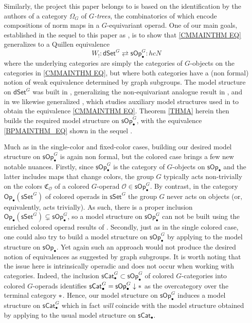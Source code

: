 \documentclass[a4paper,10pt
,draft
]{article}%
\numberwithin{equation}{section}
\numberwithin{figure}{section}
\theoremstyle{definition} %
\renewcommand{\O}{\ensuremath{\mathcal O}}
\newcommand{\1}{\ensuremath{\mathbbm 1}}%
\begin{document}
Similarly, the project this paper belongs to is based on the identification by the authors of a category
$\Omega_G$ of \emph{$G$-trees},
the combinatorics of which encode compositions of norm maps in a $G$-equivariant operad.
%
One of our main goals, established
in the sequel to this paper as \cite[Thm. I]{BP_TAS},
is to show that 
\eqref{CMMAINTHM EQ}
generalizes to a Quillen equivalence 
\begin{equation}\label{BPMAINTHM_EQ}
W_!\colon 
\mathsf{dSet}^G \rightleftarrows \mathsf{sOp}_{\bullet}^G
\colon hcN
\end{equation}
where the underlying categories are simply the categories 
of $G$-objects on the categories in 
\eqref{CMMAINTHM EQ},
but where both categories have a (non formal) notion of weak equivalence determined by graph subgroups.
The model structure on $\mathsf{dSet}^G$
was built in \cite{Per18},
generalizing the non-equivariant analogue result in \cite{BM11},
and in \cite{BP_edss} we likewise generalized \cite{CM13a},
which studies auxiliary model structures 
used in \cite{CM13b} to obtain the equivalence 
\eqref{CMMAINTHM EQ}.
Theorem \ref{THMA} herein then builds 
the required model structure on 
$\mathsf{sOp}_{\bullet}^G$,
with the equivalence \eqref{BPMAINTHM_EQ}
shown in the sequel \cite{BP_TAS}.


Much as in the single-color and fixed-color cases,
building our desired model structure
on $\mathsf{sOp}^G_{\bullet}$
is again non formal,
but the colored case brings a few new notable nuances.
Firstly, since 
$\mathsf{sOp}_{\bullet}^G$
is the category of $G$-objects on 
$\mathsf{sOp}_{\bullet}$
and the latter
includes maps that change colors,
the group $G$ typically acts non-trivially
on the colors $\mathfrak{C}_{\mathcal{O}}$
of a colored $G$-operad
$\O \in \mathsf{sOp}_{\bullet}^G$.
By contrast, in the category
$\mathsf{Op}_{\bullet}(\mathsf{sSet}^G)$
of colored operads in $\mathsf{sSet}^G$
the group $G$ never acts on objects (or, equivalently, acts trivially).
As such, there is a proper inclusion
$\mathsf{Op}_{\bullet}(\mathsf{sSet}^G)
\subsetneq \mathsf{sOp}_{\bullet}^G$,
so a model structure on 
$\mathsf{sOp}_{\bullet}^G$
can not be built using the enriched colored operad results of \cite{Cav}.
Secondly, just as in the single colored case, 
one could also try to build a model structure
on $\mathsf{sOp}^G_{\bullet}$
by applying 
\cite[Prop 2.6]{Ste16}
to the model structure on $\mathsf{sOp}_\bullet$.
Yet again such an approach would not produce
the desired notion of equivalences as suggested by graph subgroups.
%
It is worth noting that the issue here is intrinsically operadic
and does not occur when working with categories.
Indeed, the inclusion
$\mathsf{sCat}^G_{\bullet} \subset 
\mathsf{sOp}^G_{\bullet}$
of colored $G$-categories into 
colored $G$-operads identifies
$\mathsf{sCat}^G_{\bullet} = 
\mathsf{sOp}^G_{\bullet} \downarrow \**$
as the overcategory over the terminal category $\**$.
Hence, our model structure on 
$\mathsf{sOp}^G_{\bullet}$
induces a model structure on 
$\mathsf{sCat}^G_{\bullet}$ which %
in fact \emph{will} 
coincide with the model structure obtained by applying
\cite[Prop. 2.6]{Ste16}
to the usual model structure on $\mathsf{sCat}_{\bullet}$.
\end{document}
